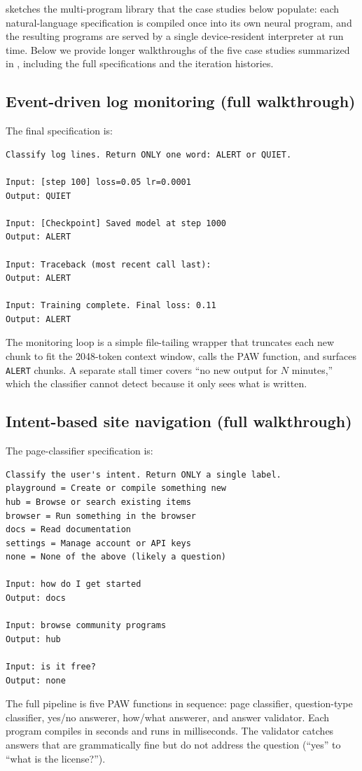  sketches the multi-program library that the case studies below populate: each natural-language specification is compiled once into its own neural program, and the resulting programs are served by a single device-resident interpreter at run time. Below we provide longer walkthroughs of the five case studies summarized in , including the full specifications and the iteration histories.

\subsection{Event-driven log monitoring (full walkthrough)}

The final specification is:
\begin{tcolorbox}[colframe=borderblue, colback=bggray]
\scriptsize
\begin{verbatim}
Classify log lines. Return ONLY one word: ALERT or QUIET.

Input: [step 100] loss=0.05 lr=0.0001
Output: QUIET

Input: [Checkpoint] Saved model at step 1000
Output: ALERT

Input: Traceback (most recent call last):
Output: ALERT

Input: Training complete. Final loss: 0.11
Output: ALERT
\end{verbatim}
\end{tcolorbox}
The monitoring loop is a simple file-tailing wrapper that truncates each new chunk to fit the 2048-token context window, calls the PAW function, and surfaces \texttt{ALERT} chunks. A separate stall timer covers ``no new output for $N$ minutes,'' which the classifier cannot detect because it only sees what is written.

\subsection{Intent-based site navigation (full walkthrough)}

The page-classifier specification is:
\begin{tcolorbox}[colframe=borderblue, colback=bggray]
\scriptsize
\begin{verbatim}
Classify the user's intent. Return ONLY a single label.
playground = Create or compile something new
hub = Browse or search existing items
browser = Run something in the browser
docs = Read documentation
settings = Manage account or API keys
none = None of the above (likely a question)

Input: how do I get started
Output: docs

Input: browse community programs
Output: hub

Input: is it free?
Output: none
\end{verbatim}
\end{tcolorbox}
The full pipeline is five PAW functions in sequence: page classifier, question-type classifier, yes/no answerer, how/what answerer, and answer validator. Each program compiles in seconds and runs in milliseconds. The validator catches answers that are grammatically fine but do not address the question (``yes'' to ``what is the license?'').

